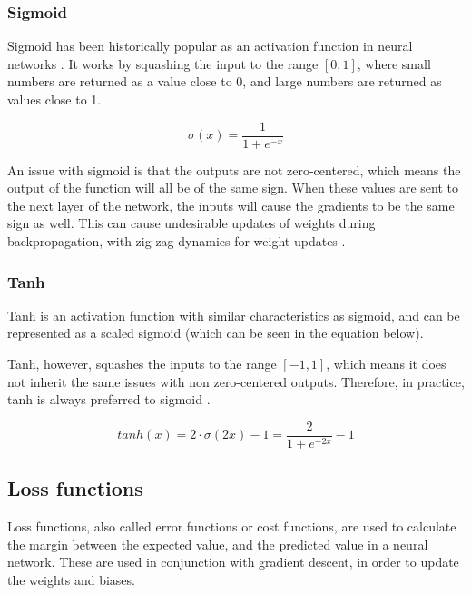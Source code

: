 \subsubsection{Sigmoid}

Sigmoid has been historically popular as an activation function in neural networks \cite{_neural_2018}. It works by squashing the input to the range $[0, 1]$, where small numbers are returned as a value close to 0, and large numbers are returned as values close to 1. 

\begin{equation} \label{eqn:sigmoid}
    \sigma(x) = \frac{1}{1 + e^{-x}}
\end{equation}

An issue with sigmoid is that the outputs are not zero-centered, which means the output of the function will all be of the same sign. When these values are sent to the next layer of the network, the inputs will cause the gradients to be the same sign as well. This can cause undesirable updates of weights during backpropagation, with zig-zag dynamics for weight updates \cite{_neural_2018}.

\subsubsection{Tanh}

Tanh is an activation function with similar characteristics as sigmoid, and can be represented as a scaled sigmoid (which can be seen in the equation below).

Tanh, however, squashes the inputs to the range $[-1, 1]$, which means it does not inherit the same issues with non zero-centered outputs. Therefore, in practice, tanh is always preferred to sigmoid \cite{_neural_2018}.

\begin{equation} \label{eqn:tanh}
    tanh(x) = 2 \cdot \sigma(2x) - 1 = \frac{2}{1+e^{-2x}} -1
\end{equation}

\subsection{Loss functions}
\label{loss_function}

Loss functions, also called error functions or cost functions, are used to calculate the margin between the expected value, and the predicted value in a neural network. These are used in conjunction with gradient descent, in order to update the weights and biases.


